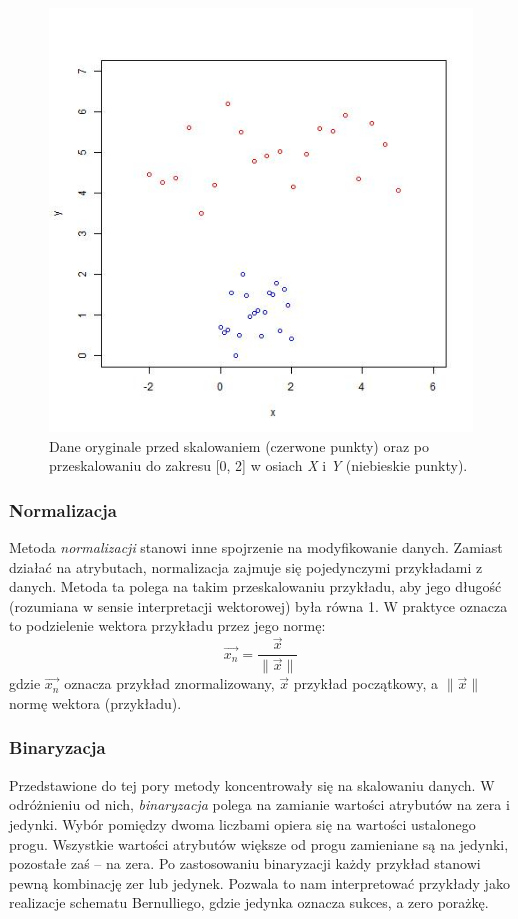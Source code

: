 \documentclass[../thesis.tex]{subfiles}
\begin{document}
\begin{figure}[h]
\centering
\includegraphics[height=.4\textheight]{scale.jpg}
\caption{Dane oryginale przed skalowaniem (czerwone punkty) oraz po przeskalowaniu do zakresu [0, 2] w osiach \emph{X} i \emph{Y} (niebieskie punkty).}
\label{classification:scale}
\end{figure}

\subsubsection{Normalizacja}

Metoda \emph{normalizacji} stanowi inne spojrzenie na modyfikowanie danych. Zamiast działać na atrybutach, normalizacja zajmuje się pojedynczymi przykładami z danych. Metoda ta polega na takim przeskalowaniu przykładu, aby jego długość (rozumiana w sensie interpretacji wektorowej) była równa 1. W praktyce oznacza to podzielenie wektora przykładu przez jego normę:
\[\vec{x_n} = \frac{\vec{x}}{\|\vec{x}\|}\]
gdzie $\vec{x_n}$ oznacza przykład znormalizowany, $\vec{x}$ przykład początkowy, a $\|\vec{x}\|$ normę wektora (przykładu).

\subsubsection{Binaryzacja}

Przedstawione do tej pory metody koncentrowały się na skalowaniu danych. W odróżnieniu od nich, \emph{binaryzacja} polega na zamianie wartości atrybutów na zera i jedynki. Wybór pomiędzy dwoma liczbami  opiera się na wartości ustalonego progu. Wszystkie wartości atrybutów większe od progu zamieniane są na jedynki, pozostałe zaś – na zera. Po zastosowaniu binaryzacji każdy przykład stanowi pewną kombinację zer lub jedynek. Pozwala to nam interpretować przykłady jako realizacje schematu Bernulliego, gdzie jedynka oznacza sukces, a zero porażkę.
\end{document}

